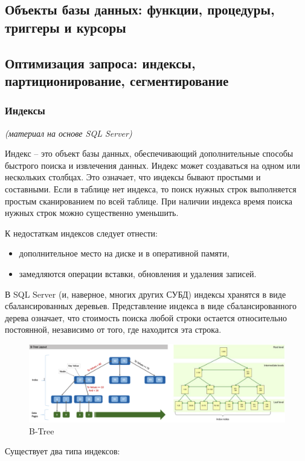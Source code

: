 \newpage

\subsection{Объекты базы данных: функции, процедуры, триггеры и курсоры}

\newpage

\subsection{Оптимизация запроса: индексы, партиционирование, сегментирование}

\subsubsection{Индексы}
\textit{(материал на основе SQL Server)}

Индекс – это объект базы данных, обеспечивающий дополнительные способы быстрого поиска и извлечения данных. Индекс может создаваться на одном или нескольких столбцах. 
Это означает, что индексы бывают простыми и составными. Если в таблице нет индекса, то поиск нужных строк выполняется простым сканированием по всей таблице. При наличии индекса время поиска нужных строк можно существенно уменьшить. 

К недостаткам индексов следует отнести:
\begin{itemize}
	\item дополнительное место на диске и в оперативной памяти, 
	\item замедляются операции вставки, обновления и удаления записей. 
\end{itemize}

В SQL Server (и, наверное, многих других СУБД) индексы хранятся в виде сбалансированных деревьев. Представление индекса в виде сбалансированного дерева означает, что стоимость поиска любой строки остается относительно постоянной, независимо от того, где находится эта строка. 

\begin{figure}[ht!]
	\centering
 	\includegraphics[width=18cm, keepaspectratio]{assets/index.png}
	\caption{B-Tree} 
\end{figure}
\FloatBarrier
Существует два типа индексов: 

